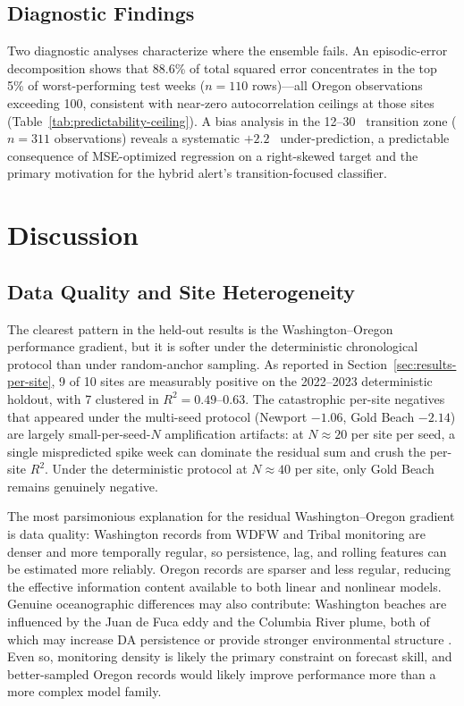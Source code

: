 \documentclass[toxins,article,submit,moreauthors]{Definitions/mdpi}
\begin{document}
\subsection{Diagnostic Findings}
\label{sec:results-diagnostics}

Two diagnostic analyses characterize where the ensemble fails. An episodic-error decomposition shows that 88.6\% of total squared error concentrates in the top 5\% of worst-performing test weeks ($n = 110$ rows)---all Oregon observations exceeding \SI{100}{\microgrampeg}, consistent with near-zero autocorrelation ceilings at those sites (Table~\ref{tab:predictability-ceiling}). A bias analysis in the 12--30~\si{\microgrampeg} transition zone ($n = 311$ observations) reveals a systematic $+2.2$~\si{\microgrampeg} under-prediction, a predictable consequence of MSE-optimized regression on a right-skewed target and the primary motivation for the hybrid alert's transition-focused classifier.

\section{Discussion}
\label{sec:discussion}

\subsection{Data Quality and Site Heterogeneity}

The clearest pattern in the held-out results is the Washington--Oregon performance gradient, but it is softer under the deterministic chronological protocol than under random-anchor sampling. As reported in Section~\ref{sec:results-per-site}, 9 of 10 sites are measurably positive on the 2022--2023 deterministic holdout, with 7 clustered in $R^2 = 0.49$--$0.63$. The catastrophic per-site negatives that appeared under the multi-seed protocol (Newport $-1.06$, Gold Beach $-2.14$) are largely small-per-seed-$N$ amplification artifacts: at $N \approx 20$ per site per seed, a single mispredicted spike week can dominate the residual sum and crush the per-site $R^2$. Under the deterministic protocol at $N \approx 40$ per site, only Gold Beach remains genuinely negative.

The most parsimonious explanation for the residual Washington--Oregon gradient is data quality: Washington records from WDFW and Tribal monitoring are denser and more temporally regular, so persistence, lag, and rolling features can be estimated more reliably. Oregon records are sparser and less regular, reducing the effective information content available to both linear and nonlinear models. Genuine oceanographic differences may also contribute: Washington beaches are influenced by the Juan de Fuca eddy and the Columbia River plume, both of which may increase DA persistence or provide stronger environmental structure \cite{Trainer2009, McCabe2023}. Even so, monitoring density is likely the primary constraint on forecast skill, and better-sampled Oregon records would likely improve performance more than a more complex model family.
\end{document}
